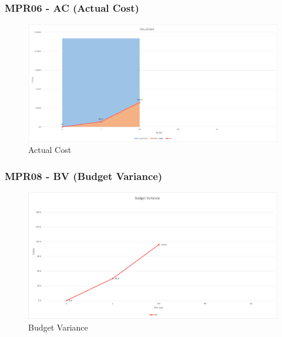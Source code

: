 \subsubsection{MPR06 - AC (Actual Cost)}
\begin{figure}[!ht]
    \caption{Actual Cost}
    \vspace{10px}
    \includegraphics[scale=0.5]{sezioni/immagini/ActualCost.png}
    \centering
\end{figure}
\subsubsection{MPR08 - BV (Budget Variance)}
\begin{figure}[!ht]
    \caption{Budget Variance}
    \vspace{10px}
    \includegraphics[scale=0.5]{sezioni/immagini/BudgetVariance.png}
    \centering
\end{figure}
\pagebreak
